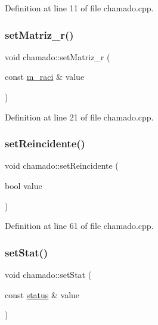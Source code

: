 Definition at line 11 of file chamado.\+cpp.

\hypertarget{classchamado_a50abfc05ae74cb6dd73137f007434475}{}\label{classchamado_a50abfc05ae74cb6dd73137f007434475} 
\subsubsection{\texorpdfstring{set\+Matriz\+\_\+r()}{setMatriz\_r()}}
{\footnotesize\ttfamily void chamado\+::set\+Matriz\+\_\+r (\begin{DoxyParamCaption}\item[{const \hyperlink{classm__raci}{m\+\_\+raci} \&}]{value }\end{DoxyParamCaption})}



Definition at line 21 of file chamado.\+cpp.

\hypertarget{classchamado_a08bf2df7a63f82df19a02dbf4f40934b}{}\label{classchamado_a08bf2df7a63f82df19a02dbf4f40934b} 
\subsubsection{\texorpdfstring{set\+Reincidente()}{setReincidente()}}
{\footnotesize\ttfamily void chamado\+::set\+Reincidente (\begin{DoxyParamCaption}\item[{bool}]{value }\end{DoxyParamCaption})}



Definition at line 61 of file chamado.\+cpp.

\hypertarget{classchamado_a9c566031546b17c00cc6a1e80fe02e11}{}\label{classchamado_a9c566031546b17c00cc6a1e80fe02e11} 
\subsubsection{\texorpdfstring{set\+Stat()}{setStat()}}
{\footnotesize\ttfamily void chamado\+::set\+Stat (\begin{DoxyParamCaption}\item[{const \hyperlink{classstatus}{status} \&}]{value }\end{DoxyParamCaption})}



